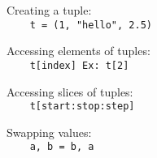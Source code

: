 Creating a tuple:\\
{\ex \lstinline|    t = (1, "hello", 2.5)|}

Accessing elements of tuples:\\
{\ex \lstinline|    t[index] Ex: t[2]|}

Accessing slices of tuples:\\
{\ex \lstinline|    t[start:stop:step]|}

Swapping values:\\
{\ex \lstinline|    a, b = b, a|}

